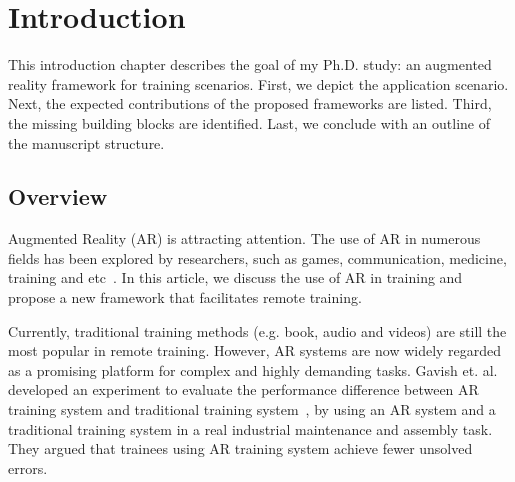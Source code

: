 \chapter{Introduction}
\label{cha:i}

This introduction chapter describes the goal of my Ph.D. study: an augmented reality framework for training scenarios.
First, we depict the application scenario.
Next, the expected contributions of the proposed frameworks are listed.
Third, the missing building blocks are identified.
Last, we conclude with an outline of the manuscript structure.

\section{Overview}
\label{sec:i:ov}

Augmented Reality (AR) is attracting attention. The use of AR in numerous fields has been explored by researchers, such as games, communication, medicine, training and etc~\cite{nakajima2003,gonzalez-franco2016,hincapie2011,webel2011}.
In this article, we discuss the use of AR in training and propose a new framework that facilitates remote training.

Currently, traditional training methods (e.g. book, audio and videos) are still the most popular in remote training. However, AR systems are now widely regarded as a promising platform for complex and highly demanding tasks.
Gavish et. al. developed an experiment to evaluate the performance difference between AR training system and traditional training system~\cite{gavish2015}, by using an AR system and a traditional training system in a real industrial maintenance and assembly task. They argued that trainees using AR training system achieve fewer unsolved errors.

